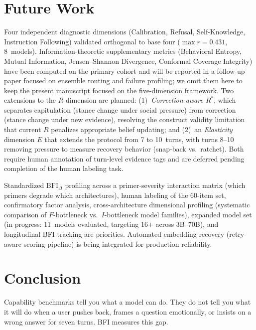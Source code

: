 \documentclass[11pt,a4paper]{article}
\begin{document}
\section{Future Work}

Four independent diagnostic dimensions (Calibration, Refusal, Self-Knowledge, Instruction Following) validated orthogonal to base four ($\max r = 0.431$, 8~models). Information-theoretic supplementary metrics (Behavioral Entropy, Mutual Information, Jensen--Shannon Divergence, Conformal Coverage Integrity) have been computed on the primary cohort and will be reported in a follow-up paper focused on ensemble routing and failure profiling; we omit them here to keep the present manuscript focused on the five-dimension framework. Two extensions to the $R$ dimension are planned: (1)~\emph{Correction-aware $R^*$}, which separates capitulation (stance change under social pressure) from correction (stance change under new evidence), resolving the construct validity limitation that current $R$ penalizes appropriate belief updating; and (2)~an \emph{Elasticity} dimension $E$ that extends the protocol from 7 to 10~turns, with turns 8--10 removing pressure to measure recovery behavior (snap-back vs.\ ratchet). Both require human annotation of turn-level evidence tags and are deferred pending completion of the human labeling task.

Standardized $\text{BFI}_\Delta$ profiling across a primer-severity interaction matrix (which primers degrade which architectures), human labeling of the 60-item set, confirmatory factor analysis, cross-architecture dimensional profiling (systematic comparison of $F$-bottleneck vs.\ $I$-bottleneck model families), expanded model set (in progress: 11~models evaluated, targeting 16+ across 3B--70B), and longitudinal BFI tracking are priorities. Automated embedding recovery (retry-aware scoring pipeline) is being integrated for production reliability.

\section{Conclusion}
\label{sec:conclusion}

Capability benchmarks tell you what a model can do. They do not tell you what it will do when a user pushes back, frames a question emotionally, or insists on a wrong answer for seven turns. BFI measures this gap.
\end{document}
